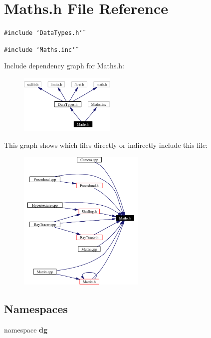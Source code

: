 \section{Maths.h File Reference}
\label{Maths_8h}
{\tt \#include \char`\"{}Data\-Types.h\char`\"{}}\par
{\tt \#include \char`\"{}Maths.inc\char`\"{}}\par


Include dependency graph for Maths.h:\begin{figure}[H]
\begin{center}
\leavevmode
\includegraphics[width=130pt]{Maths_8h__incl}
\end{center}
\end{figure}


This graph shows which files directly or indirectly include this file:\begin{figure}[H]
\begin{center}
\leavevmode
\includegraphics[width=171pt]{Maths_8h__dep__incl}
\end{center}
\end{figure}
\subsection*{Namespaces}
\begin{CompactItemize}
\item 
namespace {\bf dg}
\end{CompactItemize}
